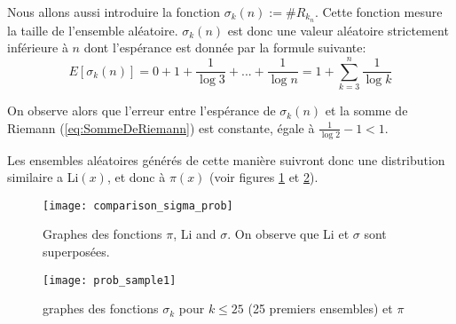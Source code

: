 \documentclass[../main.tex]{report}
\begin{document}
Nous allons aussi introduire la fonction $\sigma_k(n) := \# R_{k_n}$. Cette fonction mesure la taille de l'ensemble aléatoire.\newline
$\sigma_k(n)$ est donc une valeur aléatoire strictement inférieure à $n$ dont l'espérance est donnée par la formule suivante:
\begin{equation}
\label{eq:esperance}
E[\sigma_k(n)] = 0 + 1 + \frac{1}{\log 3} + ... + \frac{1}{\log n}
= 1 + \sum_{k=3}^{n} \frac{1}{\log k}
\end{equation}

On observe alors que l'erreur entre l'espérance de $\sigma_k(n)$ et la somme de Riemann (\ref{eq:SommeDeRiemann}) est constante, égale à
$\frac{1}{\log 2}- 1 < 1$.

Les ensembles aléatoires générés de cette manière suivront donc une distribution similaire a Li$(x)$, et donc à $\pi(x)$
(voir figures \ref{fig:comparison_sigma_prob} et \ref{fig:prob_sample}).

\begin{figure}[H]
\texttt{[image: comparison\_sigma\_prob]}

\caption{Graphes des fonctions $\pi$, Li and $\sigma$. On observe que Li et $\sigma$ sont superposées.}
\label{fig:comparison_sigma_prob}
\end{figure}

\begin{figure}[H]
	\texttt{[image: prob\_sample1]}
	\caption{graphes des fonctions $\sigma_k$ pour $k \leq 25$ (25 premiers ensembles) et $\pi$}
	\label{fig:prob_sample}
\end{figure}
\end{document}
